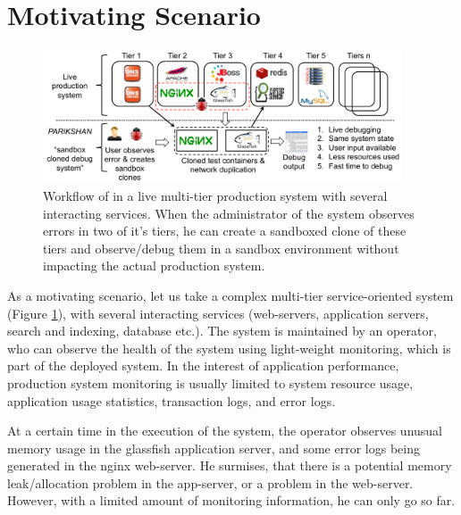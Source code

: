 \section{Motivating Scenario}
\label{sec:motivation}

\begin{figure}[ht!]
  \begin{center}
    \includegraphics[width=0.95\textwidth]{figs/workflow3.pdf}
    \caption{Workflow of \parikshan in a live multi-tier production system with several interacting services. When the administrator of the system observes errors in two of it's tiers, he can create a sandboxed clone of these tiers and observe/debug them in a sandbox environment without impacting the actual production system.}
    \label{fig:motivation}
  \end{center}
\end{figure}

\noindent
As a motivating scenario, let us take a complex multi-tier service-oriented system (Figure \ref{fig:motivation}), with several interacting services (web-servers, application servers, search and indexing, database etc.). 
The system is maintained by an operator, who can observe the health of the system using light-weight monitoring, which is part of the deployed system.
In the interest of application performance, production system monitoring is usually limited to system resource usage, application usage statistics, transaction logs, and error logs.

At a certain time in the execution of the system, the operator observes unusual memory usage in the glassfish application server, and some error logs being generated in the nginx web-server. 
He surmises, that there is a potential memory leak/allocation problem in the app-server, or a problem in the web-server.
However, with a limited amount of monitoring information, he can only go so far.

